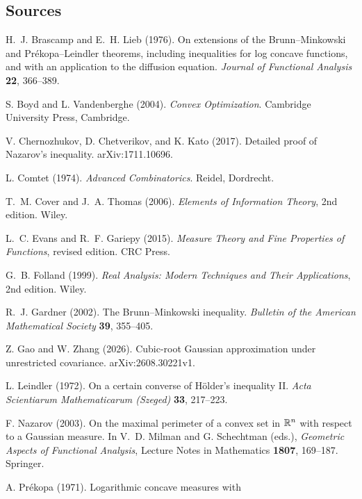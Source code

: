 \subsection{Sources}\label{tb:sec:sources}

\begin{description}\footnotesize\setlength{\itemsep}{0pt}\setlength{\parskip}{0pt}
\item[{[BL76]}] H.~J. Brascamp and E.~H. Lieb (1976). On extensions of the
Brunn--Minkowski and Pr\'ekopa--Leindler theorems, including inequalities
for log concave functions, and with an application to the diffusion
equation. \emph{Journal of Functional Analysis} \textbf{22}, 366--389.
\item[{[BV04]}] S. Boyd and L. Vandenberghe (2004).
\emph{Convex Optimization}. Cambridge University Press, Cambridge.
\item[{[CCK17N]}] V. Chernozhukov, D. Chetverikov, and K. Kato (2017).
Detailed proof of Nazarov's inequality. arXiv:1711.10696.
\item[{[Com74]}] L. Comtet (1974). \emph{Advanced Combinatorics}. Reidel,
Dordrecht.
\item[{[CT06]}] T.~M. Cover and J.~A. Thomas (2006). \emph{Elements of
Information Theory}, 2nd edition. Wiley.
\item[{[EG15]}] L.~C. Evans and R.~F. Gariepy (2015). \emph{Measure Theory
and Fine Properties of Functions}, revised edition. CRC Press.
\item[{[Fol99]}] G.~B. Folland (1999). \emph{Real Analysis: Modern
Techniques and Their Applications}, 2nd edition. Wiley.
\item[{[Gar02]}] R.~J. Gardner (2002). The Brunn--Minkowski inequality.
\emph{Bulletin of the American Mathematical Society} \textbf{39}, 355--405.
\item[{[10]}] Z. Gao and W. Zhang (2026). Cubic-root Gaussian approximation
under unrestricted covariance. arXiv:2608.30221v1.
\item[{[Lei72]}] L. Leindler (1972). On a certain converse of H\"older's
inequality II. \emph{Acta Scientiarum Mathematicarum (Szeged)} \textbf{33},
217--223.
\item[{[Naz03]}] F. Nazarov (2003). On the maximal perimeter of a convex
set in \(\mathbb R^n\) with respect to a Gaussian measure. In V.~D. Milman
and G. Schechtman (eds.), \emph{Geometric Aspects of Functional Analysis},
Lecture Notes in Mathematics \textbf{1807}, 169--187. Springer.
\item[{[Pre71]}] A. Pr\'ekopa (1971). Logarithmic concave measures with

\end{description}

